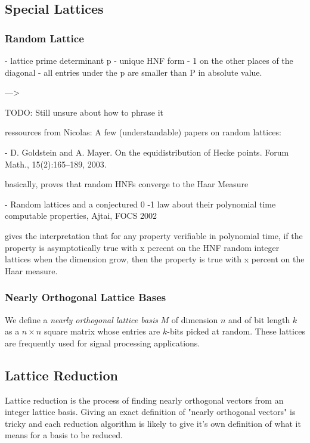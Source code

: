 \documentclass[10pt]{article}
\begin{document}
\subsection{Special Lattices}

\subsubsection{Random Lattice}





- lattice prime determinant p 
- unique HNF form
- 1 on the other places of the diagonal
- all entries under the p are smaller than P in absolute value.

---> 

TODO: Still unsure about how to phrase it

ressources from Nicolas:
A few (understandable) papers on random lattices:

- D. Goldstein and A. Mayer. On the equidistribution of Hecke points.
Forum Math., 15(2):165–189, 2003.

basically, proves that random HNFs converge to the Haar Measure

- Random lattices and a conjectured 0 -1 law about their polynomial time
computable properties, Ajtai, FOCS 2002

gives the interpretation that for any property verifiable in polynomial
time,
if the property is asymptotically true with x percent on the HNF random
integer lattices when the dimension grow,
then the property is true with x percent on the Haar measure.

\subsubsection{Nearly Orthogonal Lattice Bases}

We define a \emph{nearly orthogonal lattice basis} $M$ of dimension $n$ and of bit length $k$ as a $n \times n$ square matrix whose entries are $k$-bits picked at random. These lattices are frequently used for signal processing applications\cite{originalJacobiMethodLatticeBasisReduction}.

\subsection{Lattice Reduction}

Lattice reduction is the process of finding nearly orthogonal vectors from an integer lattice basis. Giving an exact definition of "nearly orthogonal vectors" is tricky and each reduction algorithm is likely to give it's own definition of what it means for a basis to be reduced.
\end{document}
